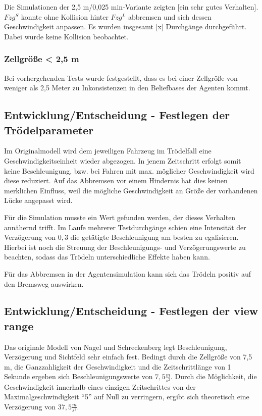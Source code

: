 Die Simulationen der 2,5 m/0,025 min-Variante zeigten [ein sehr gutes Verhalten].
$Fzg^{S}$ konnte ohne Kollision hinter $Fzg^{L}$ abbremsen und sich dessen Geschwindigkeit anpassen.
Es wurden insgesamt [x] Durchgänge durchgeführt. 
Dabei wurde keine Kollision beobachtet.

\subsubsection{Zellgröße < 2,5 m}

Bei vorhergehenden Tests wurde festgestellt, dass es bei einer Zellgröße von weniger als 2,5 Meter zu Inkonsistenzen in den Beliefbases der Agenten kommt.



\subsection{Entwicklung/Entscheidung - Festlegen der Trödelparameter}
\label{sec:lingersweetspot}

Im Originalmodell wird dem jeweiligen Fahrzeug im Trödelfall eine Geschwindigkeitseinheit wieder abgezogen. 
In jenem Zeitschritt erfolgt somit keine Beschleunigung, bzw. bei Fahren mit max. möglicher Geschwindigkeit wird diese reduziert. 
Auf das Abbremsen vor einem Hindernis hat dies keinen merklichen Einfluss, weil die mögliche Geschwindigkeit an Größe der vorhandenen Lücke angepasst wird.

Für die Simulation musste ein Wert gefunden werden, der dieses Verhalten annähernd trifft.
Im Laufe mehrerer Testdurchgänge schien eine Intensität der Verzögerung von $0,3$ die getätigte Beschleunigung am besten zu egalisieren. 
Hierbei ist noch die Streuung der Beschleunigungs- und Verzögerungswerte zu beachten, sodass das Trödeln unterschiedliche Effekte haben kann.

Für das Abbremsen in der Agentensimulation kann sich das Trödeln positiv auf den Bremsweg auswirken.



\subsection{Entwicklung/Entscheidung - Festlegen der view range}

Das originale Modell von Nagel und Schreckenberg legt Beschleunigung, Verzögerung und Sichtfeld sehr einfach fest.
Bedingt durch die Zellgröße von 7,5 m, die Ganzzahligkeit der Geschwindigkeit und die Zeitschrittlänge von 1 Sekunde ergeben sich Beschleunigungswerte von $7,5 \frac{m}{s^{2}}$. 
Durch die Möglichkeit, die Geschwindigkeit innerhalb eines einzigen Zeitschrittes von der Maximalgeschwindigkeit \enquote{5} auf Null zu verringern, ergibt sich theoretisch eine Verzögerung von $37,5 \frac{m}{s^{2}}$.

